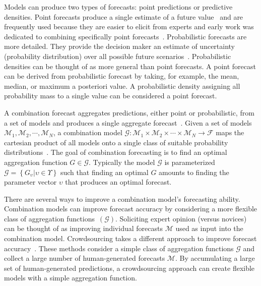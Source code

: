 \documentclass[preprint,authoryear]{elsarticle}
\def\l{\left}
\def\r{\right}
\begin{document}
Models can produce two types of forecasts: point predictions or predictive densities. 
Point forecasts produce a single estimate of a future value~\citep{bates1969combination,granger1984improved} and are frequently used because they are easier to elicit from experts and early work was dedicated to combining specifically point forecasts~\cite{granger1984improved,bates1969combination,galton1907vox}.
Probabilistic forecasts are more detailed. 
They provide the decision maker an estimate of uncertainty (probability distribution) over all possible future scenarios~\citep{clemen1999combining,stone1961opinion,winkler1981combining,genest1986combining,winkler1968consensus,dawid1995coherent,ranjan2010combining,gneiting2013combining,hora2015calibration}. 
Probabilistic densities can be thought of as more general than point forecasts.
A point forecast can be derived from probabilistic forecast by taking, for example, the mean, median, or maximum a posteriori value.
A probabilistic density assigning all probability mass to a single value can be considered a point forecast.

A combination forecast aggregates predictions, either point or probabilistic, from a set of models and produces a single aggregate forecast~\citep{clemen1999combining,winkler1981combining,genest1986combining}.
Given a set of models $\mathcal{M}_{1},\mathcal{M}_{2},\cdots,\mathcal{M}_{N}$, a combination model $\mathcal{G}:\mathcal{M}_{1} \times \mathcal{M}_{2} \times \cdots \times \mathcal{M}_{N} \to \mathcal{F}$ maps the cartesian product of all models onto a single class of suitable probability distributions~\citep{gneiting2013combining}.
The goal of combination forecasting is to find an optimal aggregation function $G \in \mathcal{G}$.
Typically the model $\mathcal{G}$ is parameterized $\mathcal{G} = \l\{ G_{\upsilon} | \upsilon \in \Upsilon \r\} $ such that finding an optimal $G$ amounts to finding the parameter vector $\upsilon$ that produces an optimal forecast.

There are several ways to improve a combination model's forecasting ability.
Combination models can improve forecast accuracy by considering a more flexible class of aggregation functions~$(\mathcal{G})$.
Soliciting expert opinion (versus novices) can be thought of as improving individual forecasts $\mathcal{M}$ used as input into the combination model.
Crowdsourcing takes a different approach to improve forecast accuracy~\citep{howe2006rise,brabham2013crowdsourcing,abernethy2011collaborative,forlines2014crowdsourcing,moran2016epidemic}. 
These methods consider a simple class of aggregation functions $\mathcal{G}$ and collect a large number of human-generated forecasts $\mathcal{M}$.
By accumulating a large set of human-generated predictions, a crowdsourcing approach can create flexible models with a simple aggregation function.
\end{document}
